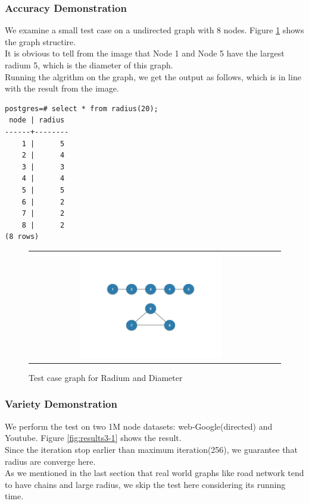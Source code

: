 \subsubsection{Accuracy Demonstration}
We examine a small test case on a undirected graph with 8 nodes. Figure \ref{fig:results4} shows the graph structire. \\
It is obvious to tell from the image that Node 1 and Node 5 have the largest radium 5, which is the diameter of this graph. \\
Running the algrithm on the graph, we get the output as follows, which is in line with the result from the image.
\begin{verbatim}
postgres=# select * from radius(20);
 node | radius 
------+--------
    1 |      5
    2 |      4
    3 |      3
    4 |      4
    5 |      5
    6 |      2
    7 |      2
    8 |      2
(8 rows)
\end{verbatim}

\begin{figure}[htbf]
\begin{center}
\begin{tabular}{cc}
     \includegraphics[width=0.6\textwidth]{FIG/task4.png} \\
\end{tabular}
\caption{Test case graph for Radium and Diameter}
\label{fig:results4}
\end{center}
\end{figure}

\subsubsection{Variety Demonstration}
We perform the test on two 1M node datasets: web-Google(directed) and Youtube. Figure \ref{fig:results3-1} shows the result. \\
Since the iteration stop earlier than maximum iteration(256), we guarantee that radius are converge here. \\
As we mentioned in the last section that real world graphs like road network tend to have chains and large radius, we skip the test here considering its running time.

